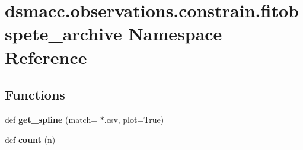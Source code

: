 \hypertarget{namespacedsmacc_1_1observations_1_1constrain_1_1fitobspete__archive}{}\section{dsmacc.\+observations.\+constrain.\+fitobspete\+\_\+archive Namespace Reference}
\label{namespacedsmacc_1_1observations_1_1constrain_1_1fitobspete__archive}
\subsection*{Functions}
\begin{DoxyCompactItemize}
\item 
\mbox{\label{namespacedsmacc_1_1observations_1_1constrain_1_1fitobspete__archive_ac58ff719ec739b182ff0d05c1face649}} 
def {\bfseries get\+\_\+spline} (match=\textquotesingle{} $\ast$.csv\textquotesingle{}, plot=True)
\item 
\mbox{\label{namespacedsmacc_1_1observations_1_1constrain_1_1fitobspete__archive_a383605cf9b411f032e40cb9f584c663d}} 
def {\bfseries count} (n)
\end{DoxyCompactItemize}
